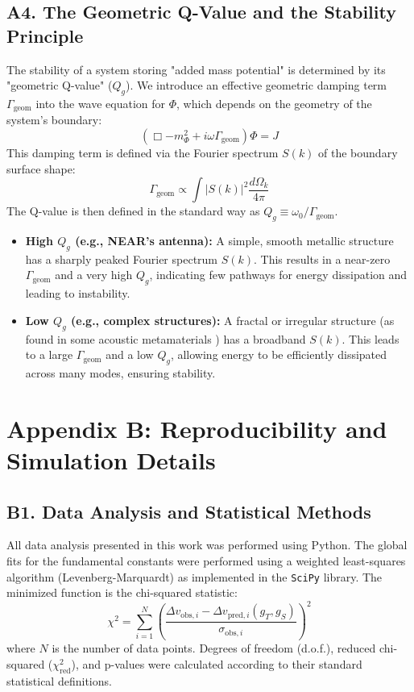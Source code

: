 \documentclass[aps,prl,twocolumn,superscriptaddress,longbibliography,floatfix]{revtex4-2}
\begin{document}
\subsection{A4. The Geometric Q-Value and the Stability Principle}
The stability of a system storing "added mass potential" is determined by its "geometric Q-value" ($Q_g$). We introduce an effective geometric damping term $\Gamma_{\text{geom}}$ into the wave equation for $\Phi$, which depends on the geometry of the system's boundary:
\begin{equation}
    (\Box - m_\Phi^2 + i\omega\Gamma_{\text{geom}}) \Phi = J
\end{equation}
This damping term is defined via the Fourier spectrum $S(k)$ of the boundary surface shape:
\begin{equation}
    \Gamma_{\text{geom}} \propto \int |S(k)|^2 \frac{d\Omega_k}{4\pi}
\end{equation}
The Q-value is then defined in the standard way as $Q_g \equiv \omega_0 / \Gamma_{\text{geom}}$.
\begin{itemize}
    \item \textbf{High $Q_g$ (e.g., NEAR's antenna):} A simple, smooth metallic structure has a sharply peaked Fourier spectrum $S(k)$. This results in a near-zero $\Gamma_{\text{geom}}$ and a very high $Q_g$, indicating few pathways for energy dissipation and leading to instability.
    \item \textbf{Low $Q_g$ (e.g., complex structures):} A fractal or irregular structure (as found in some acoustic metamaterials \cite{Cummer2016}) has a broadband $S(k)$. This leads to a large $\Gamma_{\text{geom}}$ and a low $Q_g$, allowing energy to be efficiently dissipated across many modes, ensuring stability.
\end{itemize}

\section{Appendix B: Reproducibility and Simulation Details}
\subsection{B1. Data Analysis and Statistical Methods}
All data analysis presented in this work was performed using Python. The global fits for the fundamental constants were performed using a weighted least-squares algorithm (Levenberg-Marquardt) as implemented in the \texttt{SciPy} library. The minimized function is the chi-squared statistic:
\begin{equation}
    \chi^2 = \sum_{i=1}^{N} \left( \frac{\Delta v_{\text{obs}, i} - \Delta v_{\text{pred}, i}(g_T, g_S)}{\sigma_{\text{obs}, i}} \right)^2
\end{equation}
where $N$ is the number of data points. Degrees of freedom (d.o.f.), reduced chi-squared ($\chi^2_{\text{red}}$), and p-values were calculated according to their standard statistical definitions.
\end{document}
